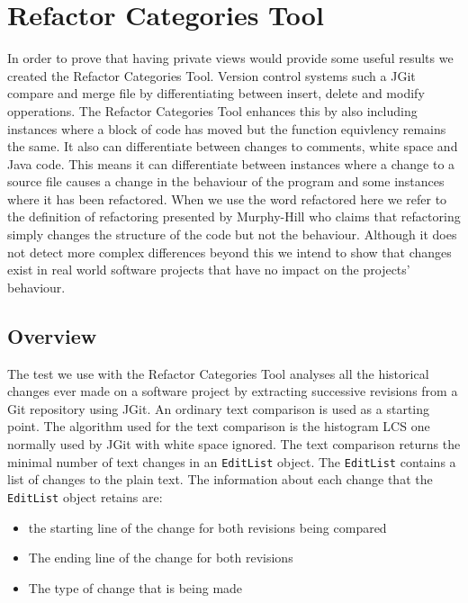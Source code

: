
\chapter{Refactor Categories Tool}
In order to prove that having private views would provide some useful results we created the Refactor Categories Tool. Version control systems such a JGit compare and merge file by differentiating between insert, delete and modify  opperations. The Refactor Categories Tool enhances this by also including instances where a block of code has moved but the function equivlency remains the same. It also can differentiate between changes to comments, white space and Java code. This means it can differentiate between instances where a change to a source file causes a change in the behaviour of the program and some instances where it has been refactored. When we use the word refactored here we refer to the definition of refactoring presented by Murphy-Hill \cite{Murphy-Hill2008} who claims that refactoring simply changes the structure of the code but not the behaviour. Although it does not detect more complex differences beyond this we intend to show that changes exist in real world software projects that have no impact on the projects' behaviour.



\section{Overview}
The test we use with the Refactor Categories Tool analyses all the historical changes ever made on a software project by extracting successive revisions from a Git repository using JGit.
An ordinary text comparison is used as a starting point.  The algorithm used for the text comparison is the histogram LCS one normally used by JGit with white space ignored. The text comparison returns the minimal number of text changes in an \lstinline{EditList} object.  The \lstinline{EditList} contains a list of changes to the plain text. The information about each change that the \lstinline{EditList} object retains are:

\begin{itemize}
  \item the starting line of the change for both revisions being compared
  \item The ending line of the change for both revisions 
  \item The type of change that is being made
\end{itemize}

